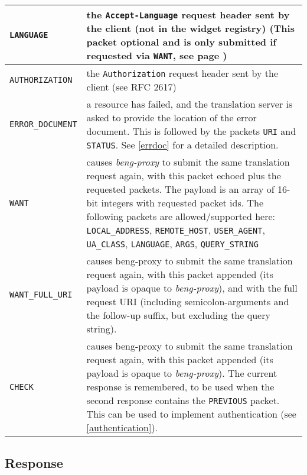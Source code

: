 \documentclass[a4paper,12pt]{article}
\begin{document}
\begin{longtable}{|l|p{10cm}|}
\hline

\verb|LANGUAGE| & the \texttt{Accept-Language} request header sent
by the client (not in the widget registry)
(This packet optional and is only submitted if requested via
\verb|WANT|, see page \pageref{want}) \\

\hline

\verb|AUTHORIZATION| & the \texttt{Authorization} request header
sent by the client (see RFC 2617) \\

\hline

\verb|ERROR_DOCUMENT| & a resource has failed, and the translation
server is asked to provide the location of the error document.  This
is followed by the packets \verb|URI| and \verb|STATUS|.  See
\ref{errdoc} for a detailed description. \\

\hline

\label{want}
\verb|WANT| & causes \emph{beng-proxy} to submit the same translation
request again, with this packet echoed plus the requested packets.
The payload is an array of 16-bit integers with requested packet ids.
The following packets are allowed/supported here:
\verb|LOCAL_ADDRESS|, \verb|REMOTE_HOST|, \verb|USER_AGENT|,
\verb|UA_CLASS|, \verb|LANGUAGE|, \verb|ARGS|, \verb|QUERY_STRING| \\

\hline

\verb|WANT_FULL_URI| & causes beng-proxy to submit the same
translation request again, with this packet appended (its payload is
opaque to \emph{beng-proxy}), and with the full request URI (including
semicolon-arguments and the follow-up suffix, but excluding the query
string). \\

\hline

\verb|CHECK| & causes beng-proxy to submit the same translation
request again, with this packet appended (its payload is opaque to
\emph{beng-proxy}).  The current response is remembered, to be used
when the second response contains the \verb|PREVIOUS| packet.  This
can be used to implement authentication (see \ref{authentication}). \\

\hline

\end{longtable}

\subsection{Response}
\label{tresponse}
\end{document}
